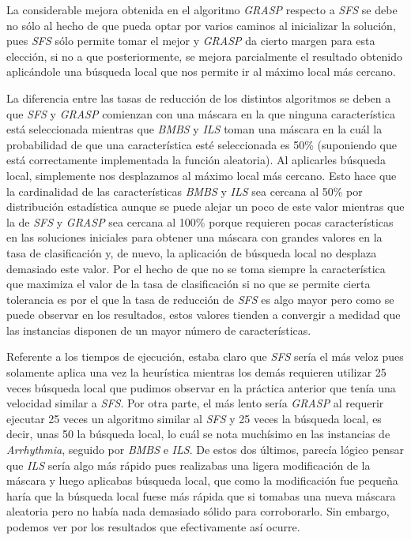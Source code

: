 \documentclass[a4paper, 11pt]{article}
\begin{document}
			La considerable mejora obtenida en el algoritmo \textit{GRASP} respecto a \textit{SFS} se
			debe no sólo al hecho de que pueda optar por varios caminos al inicializar la solución,
			pues \textit{SFS} sólo permite tomar el mejor y \textit{GRASP} da cierto margen para esta
			elección, si no a que posteriormente, se mejora parcialmente el resultado obtenido aplicándole
			una búsqueda local que nos permite ir al máximo local más cercano.
			
			La diferencia entre las tasas de reducción de los distintos algoritmos se deben a que \textit{SFS}
			y \textit{GRASP} comienzan con una máscara en la que ninguna característica está seleccionada
			mientras que \textit{BMBS} y \textit{ILS} toman una máscara en la cuál la probabilidad de que
			una característica esté seleccionada es 50\% (suponiendo que está correctamente implementada
			la función aleatoria). Al aplicarles búsqueda local, simplemente nos desplazamos al máximo
			local más cercano. Esto hace que la cardinalidad de las características \textit{BMBS} y \textit{ILS}
			sea cercana al 50\% por distribución estadística aunque se puede alejar un poco de este valor
			mientras que la de \textit{SFS} y \textit{GRASP} sea cercana al 100\% porque requieren pocas
			características en las soluciones iniciales para obtener una máscara con grandes valores en
			la tasa de clasificación y, de nuevo, la aplicación de búsqueda local no desplaza demasiado
			este valor. Por el hecho de que no se toma siempre la característica que maximiza el valor
			de la tasa de clasificación si no que se permite cierta tolerancia es por el que la tasa de
			reducción de \textit{SFS} es algo mayor pero como se puede observar en los resultados, estos
			valores tienden a convergir a medidad que las instancias disponen de un mayor número de
			características.
			
			Referente a los tiempos de ejecución, estaba claro que \textit{SFS} sería el más veloz pues
			solamente aplica una vez la heurística mientras los demás requieren utilizar 25 veces búsqueda
			local que pudimos observar en la práctica anterior que tenía una velocidad similar a \textit{SFS}.
			Por otra parte, el más lento sería \textit{GRASP} al requerir ejecutar 25 veces un algoritmo
			similar al \textit{SFS} y 25 veces la búsqueda local, es decir, unas 50 la búsqueda local, lo
			cuál se nota muchísimo en las instancias de \textit{Arrhythmia}, seguido por \textit{BMBS}
			e \textit{ILS}. De estos dos últimos, parecía lógico pensar que \textit{ILS} sería algo más
			rápido pues realizabas una ligera modificación de la máscara y luego aplicabas búsqueda local,
			que como la modificación fue pequeña haría que la búsqueda local fuese más rápida que si tomabas
			una nueva máscara aleatoria pero no había nada demasiado sólido para corroborarlo. Sin
			embargo, podemos ver por los resultados que efectivamente así ocurre.
	
	\newpage
	
\end{document}
